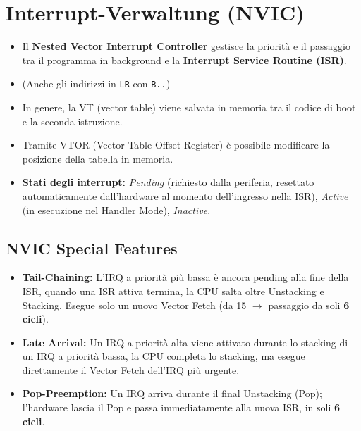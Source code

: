 \section{Interrupt-Verwaltung (NVIC)}

\begin{itemize}
    \item Il \textbf{Nested Vector Interrupt Controller} gestisce la priorità e il passaggio tra il programma in background e la \textbf{Interrupt Service Routine (ISR)}.
    \item {} (Anche gli indirizzi in \texttt{LR} con \texttt{B..})
    \item In genere, la VT (vector table) viene salvata in memoria tra il codice di boot e la seconda istruzione.
    \item Tramite VTOR (Vector Table Offset Register) è possibile modificare la posizione della tabella in memoria.
    \item \textbf{Stati degli interrupt:} \textit{Pending} (richiesto dalla periferia, resettato automaticamente dall'hardware al momento dell'ingresso nella ISR), \textit{Active} (in esecuzione nel Handler Mode), \textit{Inactive}.
\end{itemize}

\subsection{NVIC Special Features}
\begin{itemize}
    \item \textbf{Tail-Chaining:} L'IRQ a priorità più bassa è ancora pending alla fine della ISR,
    quando una ISR attiva termina, la CPU salta oltre Unstacking e Stacking.
    Esegue solo un nuovo Vector Fetch
    (da 15 $\rightarrow$ passaggio da soli \textbf{6 cicli}).
    \item \textbf{Late Arrival:} Un IRQ a priorità alta viene attivato durante lo stacking di un IRQ a priorità bassa,
    la CPU completa lo stacking, ma esegue direttamente il Vector Fetch dell'IRQ più urgente.
    \item \textbf{Pop-Preemption:} Un IRQ arriva durante il final Unstacking (Pop); l'hardware lascia il Pop e passa immediatamente alla nuova ISR, in soli \textbf{6 cicli}.
\end{itemize}

